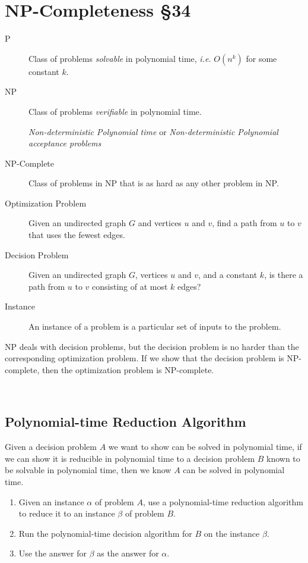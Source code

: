 \section{NP-Completeness \S 34}

\begin{description}
	\item [P]  Class of problems {\it solvable} in polynomial time, {\it i.e.} $O(n^k)$ for some constant $k$.  
	\item [NP] Class of problems {\it verifiable} in polynomial time.  
	
	{\it Non-deterministic Polynomial time} or {\it Non-deterministic Polynomial acceptance problems}
	\item [NP-Complete] Class of problems in NP that is as hard as any other problem in NP.  
	\item [Optimization Problem] Given an undirected graph $G$ and vertices $u$ and $v$, find a path from $u$ to $v$ that uses the fewest edges.  
	\item [Decision Problem] Given an undirected graph $G$, vertices $u$ and $v$, and a constant $k$, is there a path from $u$ to $v$ consisting of at most $k$ edges?
	\item [Instance] An instance of a problem is a particular set of inputs to the problem.
\end{description}

	NP deals with decision problems, but the decision problem is no harder than the corresponding optimization problem.  If we show that the decision problem is NP-complete, then the optimization problem is NP-complete.  

\

\subsection{Polynomial-time Reduction Algorithm}

Given a decision problem $A$ we want to show can be solved in polynomial time, if we can show it is reducible in polynomial time to a decision problem $B$ known to be solvable in polynomial time, then we know $A$ can be solved in polynomial time.  

\begin{enumerate}
	\item Given an instance $\alpha$ of problem $A$, use a polynomial-time reduction algorithm to reduce it to an instance $\beta$ of problem $B$.  
	\item Run the polynomial-time decision algorithm for $B$ on the instance $\beta$.  
	\item Use the answer for $\beta$ as the answer for $\alpha$.  
\end{enumerate}

